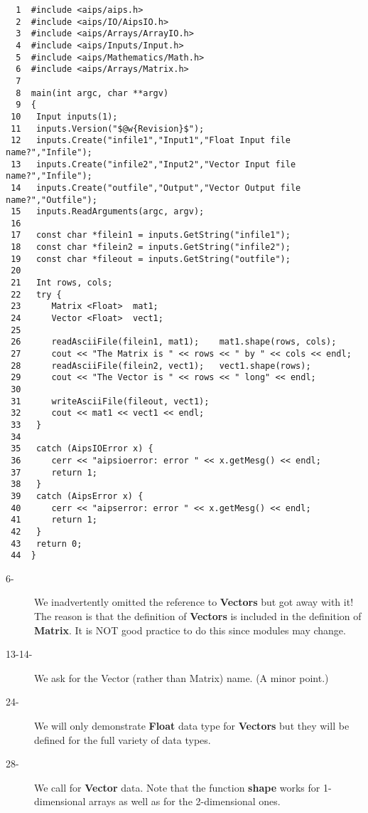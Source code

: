 \begin{verbatim}
  1  #include <aips/aips.h>
  2  #include <aips/IO/AipsIO.h>
  3  #include <aips/Arrays/ArrayIO.h>
  4  #include <aips/Inputs/Input.h>
  5  #include <aips/Mathematics/Math.h>
  6  #include <aips/Arrays/Matrix.h>
  7
  8  main(int argc, char **argv)
  9  {
 10   Input inputs(1);
 11   inputs.Version("$@w{Revision}$");
 12   inputs.Create("infile1","Input1","Float Input file name?","Infile");
 13   inputs.Create("infile2","Input2","Vector Input file name?","Infile");
 14   inputs.Create("outfile","Output","Vector Output file name?","Outfile");
 15   inputs.ReadArguments(argc, argv);
 16
 17   const char *filein1 = inputs.GetString("infile1");
 18   const char *filein2 = inputs.GetString("infile2");
 19   const char *fileout = inputs.GetString("outfile");
 20
 21   Int rows, cols;
 22   try {
 23      Matrix <Float>  mat1;
 24      Vector <Float>  vect1;
 25
 26      readAsciiFile(filein1, mat1);    mat1.shape(rows, cols);
 27      cout << "The Matrix is " << rows << " by " << cols << endl;
 28      readAsciiFile(filein2, vect1);   vect1.shape(rows);
 29      cout << "The Vector is " << rows << " long" << endl;
 30
 31      writeAsciiFile(fileout, vect1);
 32      cout << mat1 << vect1 << endl;
 33   }
 34
 35   catch (AipsIOError x) {
 36      cerr << "aipsioerror: error " << x.getMesg() << endl;
 37      return 1;
 38   }
 39   catch (AipsError x) {
 40      cerr << "aipserror: error " << x.getMesg() << endl;
 41      return 1;
 42   }
 43   return 0;
 44  }
\end{verbatim}

\begin{description}
\item[6-] We inadvertently omitted the reference to {\bf Vectors} but got away with it!
The reason is that the definition of {\bf Vectors} is included in the definition
of {\bf Matrix}.  It is NOT good practice to do this since modules may change.

\item[13-14-] We ask for the Vector (rather than Matrix) name. (A minor point.)

\item[24-] We will only demonstrate {\bf Float} data type for {\bf Vectors} but they will
be defined for the full variety of data types.

\item[28-] We call for {\bf Vector} data. Note that the function {\bf shape} works for
1-dimensional arrays as well as for the 2-dimensional ones.
\end{description}


